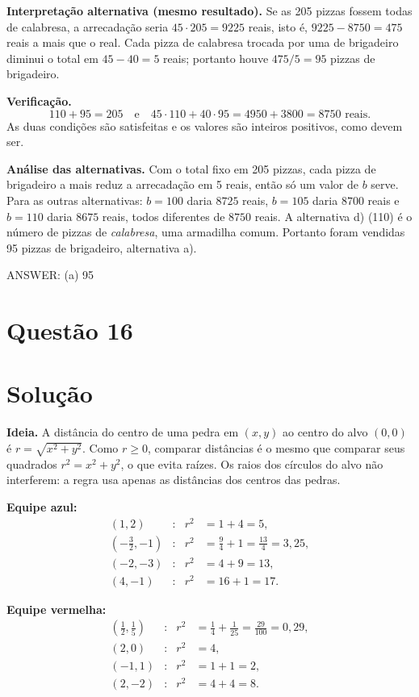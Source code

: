 \documentclass{article}%
\begin{document}
\textbf{Interpretação alternativa (mesmo resultado).} Se as 205 pizzas fossem todas de calabresa, a arrecadação seria $45\cdot 205=9225$ reais, isto é, $9225-8750=475$ reais a mais que o real. Cada pizza de calabresa trocada por uma de brigadeiro diminui o total em $45-40=5$ reais; portanto houve $475/5=95$ pizzas de brigadeiro.

\textbf{Verificação.}
\[
110+95=205 \quad\text{e}\quad 45\cdot 110+40\cdot 95=4950+3800=8750 \text{ reais}.
\]
As duas condições são satisfeitas e os valores são inteiros positivos, como devem ser.

\textbf{Análise das alternativas.} Com o total fixo em 205 pizzas, cada pizza de brigadeiro a mais reduz a arrecadação em 5 reais, então só um valor de $b$ serve. Para as outras alternativas: $b=100$ daria $8725$ reais, $b=105$ daria $8700$ reais e $b=110$ daria $8675$ reais, todos diferentes de $8750$ reais. A alternativa d) (110) é o número de pizzas de \emph{calabresa}, uma armadilha comum. Portanto foram vendidas 95 pizzas de brigadeiro, alternativa a).

ANSWER: (a) 95%
\newpage%
\section*{Questão 16}

\section*{Solução}

\textbf{Ideia.} A distância do centro de uma pedra em $(x,y)$ ao centro do alvo $(0,0)$ é $r=\sqrt{x^2+y^2}$. Como $r\geq 0$, comparar distâncias é o mesmo que comparar seus quadrados $r^2=x^2+y^2$, o que evita raízes. Os raios dos círculos do alvo não interferem: a regra usa apenas as distâncias dos centros das pedras.

\textbf{Equipe azul:}
\begin{align*}
(1,2)&: & r^2&=1+4=5,\\
\left(-\tfrac{3}{2},-1\right)&: & r^2&=\tfrac{9}{4}+1=\tfrac{13}{4}=3{,}25,\\
(-2,-3)&: & r^2&=4+9=13,\\
(4,-1)&: & r^2&=16+1=17.
\end{align*}

\textbf{Equipe vermelha:}
\begin{align*}
\left(\tfrac{1}{2},\tfrac{1}{5}\right)&: & r^2&=\tfrac{1}{4}+\tfrac{1}{25}=\tfrac{29}{100}=0{,}29,\\
(2,0)&: & r^2&=4,\\
(-1,1)&: & r^2&=1+1=2,\\
(2,-2)&: & r^2&=4+4=8.
\end{align*}
\end{document}

